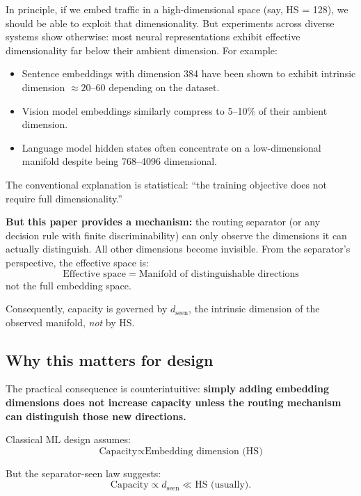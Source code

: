\documentclass[11pt]{article}
\begin{document}
In principle, if we embed traffic in a high-dimensional space (say, HS = 128), we should be able to
exploit that dimensionality. But experiments across diverse systems show otherwise: most neural
representations exhibit effective dimensionality far below their ambient dimension.
For example:
\begin{itemize}
  \item Sentence embeddings with dimension 384 have been shown to exhibit intrinsic dimension $\approx 20$--$60$ depending on the dataset.
  \item Vision model embeddings similarly compress to 5--10\% of their ambient dimension.
  \item Language model hidden states often concentrate on a low-dimensional manifold despite being 768--4096 dimensional.
\end{itemize}

The conventional explanation is statistical: ``the training objective does not require full dimensionality.''

\textbf{But this paper provides a mechanism:} the routing separator (or any decision rule with finite discriminability)
can only observe the dimensions it can actually distinguish.
All other dimensions become invisible.
From the separator's perspective, the effective space is:
\[
  \text{Effective space} \;=\; \text{Manifold of distinguishable directions}
\]
not the full embedding space.

Consequently, capacity is governed by $d_{\text{seen}}$, the intrinsic dimension of the observed manifold,
\emph{not} by HS.

\subsection{Why this matters for design}

The practical consequence is counterintuitive: \textbf{simply adding embedding dimensions does not increase capacity
unless the routing mechanism can distinguish those new directions.}

Classical ML design assumes:
\begin{equation}
  \text{Capacity} \propto \text{Embedding dimension (HS)}
\end{equation}

But the separator-seen law suggests:
\begin{equation}
  \text{Capacity} \propto d_{\text{seen}} \ll \text{HS (usually)}.
\end{equation}
\end{document}
